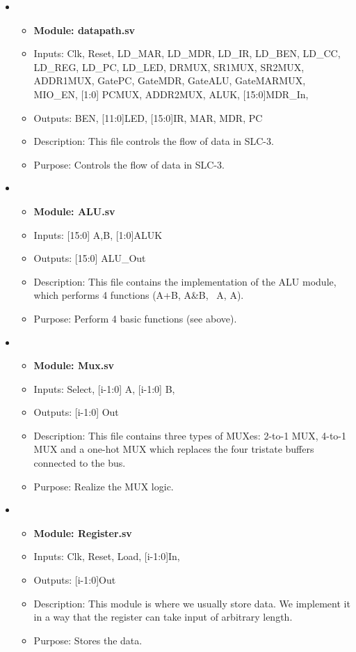\documentclass[11pt]{article}
\begin{document}
\begin{itemize}
    \item 
    \begin{itemize}
        \item \textbf{Module: datapath.sv}
        \item Inputs: Clk, Reset,
        LD\_MAR, LD\_MDR, LD\_IR, LD\_BEN, LD\_CC, LD\_REG, LD\_PC, LD\_LED,
        DRMUX, SR1MUX, SR2MUX, ADDR1MUX,
        GatePC, GateMDR, GateALU, GateMARMUX,
        MIO\_EN,
        [1:0] PCMUX, ADDR2MUX, ALUK,
        [15:0]MDR\_In,
        \item Outputs: BEN,
        [11:0]LED,
        [15:0]IR, MAR, MDR, PC
        \item Description: This file controls the flow of data in SLC-3.
        \item Purpose: Controls the flow of data in SLC-3.
    \end{itemize}

    \item
    \begin{itemize}
        \item \textbf{Module: ALU.sv}
        \item Inputs: [15:0] A,B, [1:0]ALUK
        \item Outputs: [15:0] ALU\_Out
        \item Description: This file contains the implementation of the ALU module, which performs 4 functions (A+B, A\&B, ~A, A).
        \item Purpose: Perform 4 basic functions (see above).
    \end{itemize}

    \item
    \begin{itemize}
        \item \textbf{Module: Mux.sv}
        \item Inputs: Select,
       [i-1:0] A,
        [i-1:0] B,
        \item Outputs: [i-1:0] Out
        \item Description: This file contains three types of MUXes: 2-to-1 MUX, 4-to-1 MUX and a one-hot MUX which replaces the four tristate buffers connected to the bus.
        \item Purpose: Realize the MUX logic.
    \end{itemize}

    \item
    \begin{itemize}
        \item \textbf{Module: Register.sv}
        \item Inputs: Clk,
        Reset,
         Load,
         [i-1:0]In,
        \item Outputs: [i-1:0]Out
        \item Description: This module is where we usually store data. We implement it in a way that the register can take input of arbitrary length.
        \item Purpose: Stores the data.
    \end{itemize}


\end{itemize}
\end{document}
